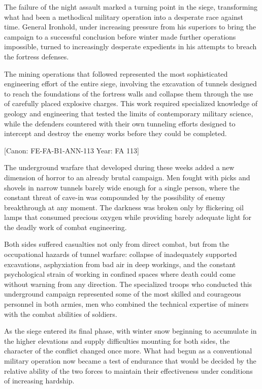 The failure of the night assault marked a turning point in the siege,
transforming what had been a methodical military operation into a
desperate race against time. General Ironhold, under increasing pressure
from his superiors to bring the campaign to a successful conclusion
before winter made further operations impossible, turned to increasingly
desperate expedients in his attempts to breach the fortress defenses.

The mining operations that followed represented the most sophisticated
engineering effort of the entire siege, involving the excavation of
tunnels designed to reach the foundations of the fortress walls and
collapse them through the use of carefully placed explosive charges.
This work required specialized knowledge of geology and engineering that
tested the limits of contemporary military science, while the defenders
countered with their own tunneling efforts designed to intercept and
destroy the enemy works before they could be completed.

{[}Canon: FE-FA-B1-ANN-113 \textbar{} Year: FA 113{]}

The underground warfare that developed during these weeks added a new
dimension of horror to an already brutal campaign. Men fought with picks
and shovels in narrow tunnels barely wide enough for a single person,
where the constant threat of cave-in was compounded by the possibility
of enemy breakthrough at any moment. The darkness was broken only by
flickering oil lamps that consumed precious oxygen while providing
barely adequate light for the deadly work of combat engineering.

Both sides suffered casualties not only from direct combat, but from the
occupational hazards of tunnel warfare: collapse of inadequately
supported excavations, asphyxiation from bad air in deep workings, and
the constant psychological strain of working in confined spaces where
death could come without warning from any direction. The specialized
troops who conducted this underground campaign represented some of the
most skilled and courageous personnel in both armies, men who combined
the technical expertise of miners with the combat abilities of soldiers.

As the siege entered its final phase, with winter snow beginning to
accumulate in the higher elevations and supply difficulties mounting for
both sides, the character of the conflict changed once more. What had
begun as a conventional military operation now became a test of
endurance that would be decided by the relative ability of the two
forces to maintain their effectiveness under conditions of increasing
hardship.

